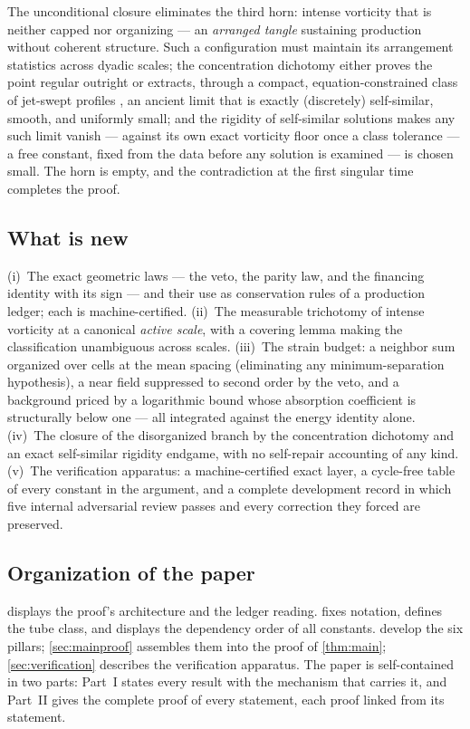 \documentclass[11pt,letterpaper]{amsart}
\theoremstyle{definition}
\theoremstyle{remark}
\begin{document}
The unconditional closure eliminates the third horn: intense vorticity that is neither
capped nor organizing --- an \emph{arranged tangle} sustaining production without
coherent structure. Such a configuration must maintain its arrangement statistics
across dyadic scales; the concentration dichotomy either proves the point regular outright or
extracts, through a compact, equation-constrained class of jet-swept profiles
\cite{CKN1982,LemarieRieusset2002,KikuchiSeregin2007}, an ancient limit that is
exactly (discretely) self-similar, smooth, and uniformly small; and the
rigidity of self-similar solutions \cite{Tsai1998,NRS1996,Tsai2014,ChaeWolf2017}
makes any such limit vanish --- against its own exact vorticity floor
\cite{CKN1982,Lin1998} once a class tolerance --- a free constant, fixed from the data
before any solution is examined --- is chosen small. The horn is empty, and the
contradiction at the first singular time completes the proof.

\subsection{What is new}\label{subsec:new}
(i)~The exact geometric laws --- the veto, the parity law, and the financing identity
with its sign --- and their use as conservation rules of a production ledger; each is
machine-certified. (ii)~The measurable trichotomy of intense vorticity at a canonical
\emph{active scale}, with a covering lemma making the classification unambiguous
across scales. (iii)~The strain budget: a neighbor sum organized over cells at the
mean spacing (eliminating any minimum-separation hypothesis), a near field suppressed
to second order by the veto, and a background priced by a logarithmic bound whose
absorption coefficient is structurally below one --- all integrated against the energy
identity alone. (iv)~The closure of the disorganized branch by the concentration dichotomy
and an exact self-similar rigidity endgame, with no self-repair accounting of
any kind. (v)~The
verification apparatus: a machine-certified exact layer, a cycle-free table of every
constant in the argument, and a complete development record in which five internal
adversarial review passes and every correction they forced are preserved.

\subsection{Organization of the paper}\label{subsec:organization}
 displays the proof's architecture and the ledger reading.
 fixes notation, defines the tube class, and displays the dependency
order of all constants. 
develop the six pillars; \cref{sec:mainproof} assembles them into the proof of
\cref{thm:main}; \cref{sec:verification} describes the verification apparatus. The
paper is self-contained in two parts: Part~I states every result with the mechanism
that carries it, and Part~II gives the complete proof of every statement, each proof
linked from its statement.
\end{document}
